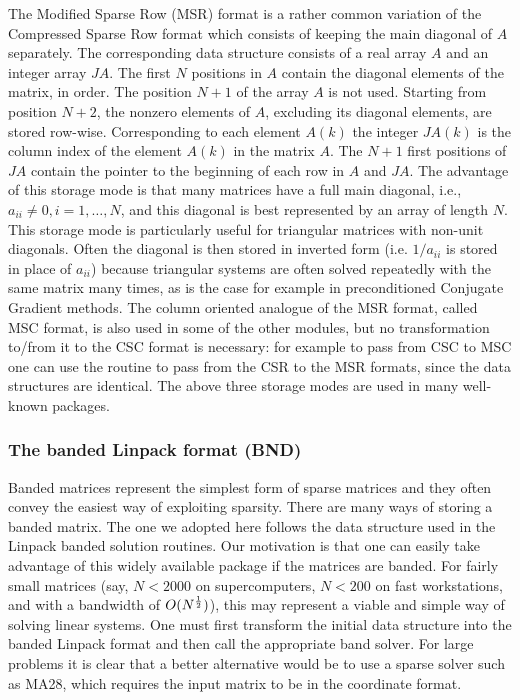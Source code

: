 The Modified Sparse Row (MSR) format is a rather common variation of
the Compressed Sparse Row format which consists of keeping the main
diagonal of $A$ separately. The corresponding data structure consists
of a real array $A$ and an integer array $JA$. The first $N$ positions
in $A$ contain the diagonal elements of the matrix, in order.  The position
$N+1$ of the array $A$ is not used. Starting from position $N+2$, the
nonzero elements of $A$, excluding its diagonal elements, are stored
row-wise. Corresponding to each element $A(k)$ the integer $JA(k)$ is
the column index of the element $A(k)$ in the matrix $A$. The $N+1$
first positions of $JA$ contain the pointer to the beginning of each
row in $A$ and $JA$. The advantage of this storage mode is that many
matrices have a full main diagonal, i.e., $a_{ii} \ne 0, i=1,\ldots,
N$, and this diagonal is best represented by an array of length $N$.
This storage mode is particularly useful for triangular matrices with
non-unit diagonals. Often the diagonal is then stored in inverted form
(i.e. $1/a_{ii} $ is stored in place of $a_{ii} $) because triangular
systems are often solved repeatedly with the same matrix many times,
as is the case for example in preconditioned Conjugate Gradient
methods.  The column oriented analogue of the MSR format, called MSC
format, is also used in some of the other modules, but no
transformation to/from it to the CSC format is necessary: for example
to pass from CSC to MSC one can use the routine to pass from the CSR
to the MSR formats, since the data structures are identical.  The 
 above three storage modes are used in many well-known packages.

\subsubsection{The banded Linpack format (BND)} 
Banded matrices represent the simplest form of sparse matrices and
they often convey the easiest way of exploiting sparsity.  There are
many ways of storing a banded matrix. The one we adopted here follows
the data structure used in the Linpack banded solution routines. Our
motivation is that one can easily take advantage of this widely available 
package if the matrices are banded.  For fairly small matrices (say,
$N < 2000$ on supercomputers, $ N < 200 $ on fast workstations, and
with a bandwidth of $O(N^{{1\over2}} )$), this may represent a viable and
simple way of solving linear systems. One must first transform the
initial data structure into the banded Linpack format and then call the
appropriate band solver. For large problems it is clear that a better
alternative would be to use a sparse solver such as MA28, which
requires the input matrix to be in the coordinate format. 

